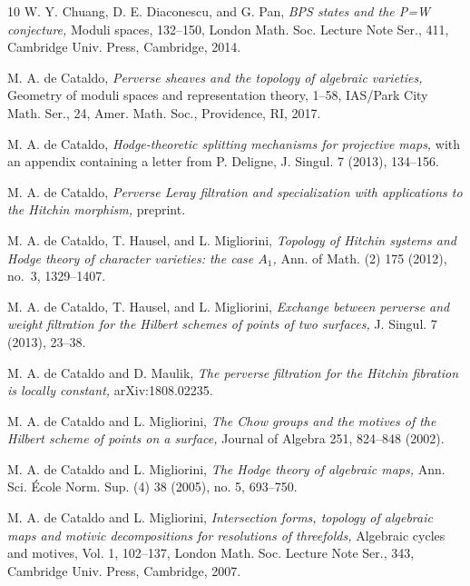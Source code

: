 \documentclass[11pt]{amsart}
\theoremstyle{plain}
\theoremstyle{definition}
\theoremstyle{remark}
\begin{document}
\begin{thebibliography}{10}
 W. Y. Chuang, D. E. Diaconescu, and G. Pan, {\em BPS states and the P=W conjecture,} Moduli spaces, 132--150, London Math. Soc. Lecture Note Ser., 411, Cambridge Univ. Press, Cambridge, 2014.

  M. A. de Cataldo, {\em Perverse sheaves and the topology of algebraic varieties,} Geometry of moduli spaces and representation theory, 1--58, IAS/Park City Math. Ser., 24, Amer. Math. Soc., Providence, RI, 2017. 



 M. A. de Cataldo, {\em Hodge-theoretic splitting mechanisms for projective maps,} with an appendix containing a letter from P. Deligne, J. Singul. 7 (2013), 134--156.

 M. A. de Cataldo, {\em Perverse Leray filtration and specialization with applications to the Hitchin morphism,} preprint.


 M. A. de Cataldo, T. Hausel, and L. Migliorini, {\em Topology of Hitchin systems and Hodge theory of character varieties: the case $A_1$,} Ann. of Math. (2) 175 (2012), no.~3, 1329--1407.

 M. A. de Cataldo, T. Hausel, and L. Migliorini, {\em Exchange between perverse and weight filtration for the Hilbert schemes of points of two surfaces,} J. Singul. 7 (2013), 23--38.

 M. A. de Cataldo and D. Maulik, {\em The perverse filtration for the Hitchin fibration is locally constant,} arXiv:1808.02235.


 M. A. de Cataldo and L. Migliorini, {\em The Chow groups and the motives of the Hilbert scheme of points on a surface,} Journal of Algebra 251, 824--848 (2002).


 M. A. de Cataldo and L. Migliorini, {\em The Hodge theory of algebraic maps,} Ann. Sci. \'Ecole Norm. Sup. (4) 38 (2005), no. 5, 693--750.

 M. A. de Cataldo and L. Migliorini, {\em Intersection forms, topology of algebraic maps and motivic decompositions for resolutions of threefolds,} Algebraic cycles and motives, Vol. 1, 102--137, London Math. Soc. Lecture Note Ser., 343, Cambridge Univ. Press, Cambridge, 2007.


\end{thebibliography}
\end{document}
